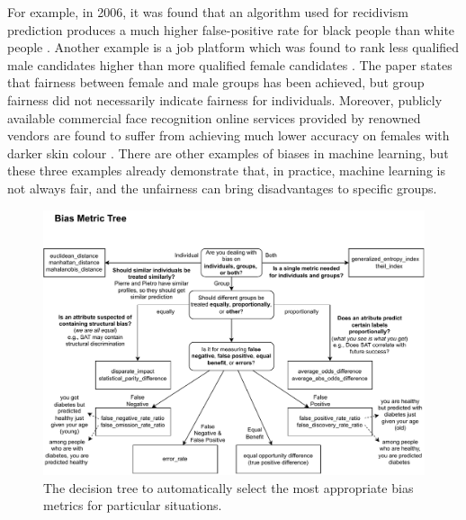 \documentclass[sigconf]{acmart}
\begin{document}
	For example, in 2006, it was found that an algorithm used for recidivism prediction produces a much higher false-positive rate for black people than white people \cite{angwin2016machine}. Another example is a job platform which was found to rank less qualified male candidates higher than more qualified female candidates \cite{lahoti2019ifair}. The paper states that fairness between female and male groups has been achieved, but group fairness did not necessarily indicate fairness for individuals. Moreover, publicly available commercial face recognition online services provided by renowned vendors are found to suffer from achieving much lower accuracy on females with darker skin colour \cite{buolamwini2018gender}. There are other examples of biases in machine learning, but these three examples already demonstrate that, in practice, machine learning is not always fair, and the unfairness can bring disadvantages to specific groups. 
	
	\begin{figure}[h]
		\includegraphics[width=\linewidth]{figures/wizard-metric}
		\caption{The decision tree to automatically select the most appropriate bias metrics for particular situations.}
		\label{fig:wizard-metric}
	\end{figure}
	
\end{document}
